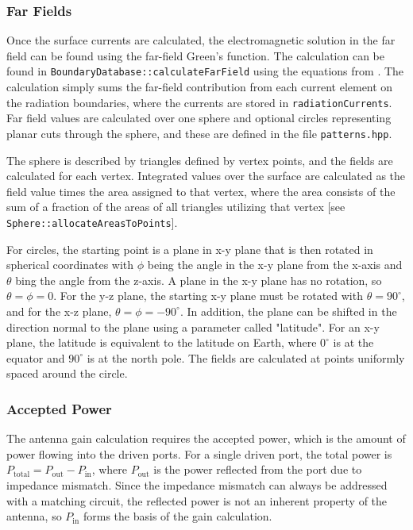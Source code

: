 \documentclass[titlepage]{article}
\renewcommand\_{\textunderscore\linebreak[1]}
\begin{document}
\subsubsection{Far Fields}

Once the surface currents are calculated, the electromagnetic solution in the far field can be found using the far-field Green's function.  The calculation can be found in \texttt{BoundaryDatabase::calculateFarField} using the equations from \cite{Balanis}.  The calculation simply sums the far-field contribution from each current element on the radiation boundaries, where the currents are stored in \texttt{radiationCurrents}.
Far field values are calculated over one sphere and optional circles representing planar cuts through the sphere, and these are defined in the file \texttt{patterns.hpp}.

The sphere is described by triangles defined by vertex points, and the fields are calculated for each vertex.  Integrated values over the surface are calculated as the field value times the area assigned to that vertex, where the area consists of the sum of a fraction of the areas of all triangles utilizing that vertex [see \texttt{Sphere::allocateAreasToPoints}].

For circles, the starting point is a plane in x-y plane that is then rotated in spherical coordinates with $\phi$ being the angle in the x-y plane from the x-axis and $\theta$ bing the angle from the z-axis.  A plane in the x-y plane has no rotation, so $\theta=\phi=0$.  For the y-z plane, the starting x-y plane must be rotated with $\theta=90^\circ$, and for the x-z plane, $\theta=\phi=-90^\circ$.  In addition, the plane can be shifted in the direction normal to the plane using a parameter called "latitude".  For an x-y plane, the latitude is equivalent to the latitude on Earth, where $0^\circ$ is at the equator and $90^\circ$ is at the north pole.  The fields are calculated at points uniformly spaced around the circle.

\subsubsection{Accepted Power}

The antenna gain calculation requires the accepted power, which is the amount of power flowing into the driven ports. For a single driven port, the total power is $P_{\text{total}}=P_{\text{out}}-P_{\text{in}}$, where $P_{\text{out}}$ is the power reflected from the port due to impedance mismatch.  Since the impedance mismatch can always be addressed with a matching circuit, the reflected power is not an inherent property of the antenna, so $P_{\text{in}}$ forms the basis of the gain calculation.
\end{document}
